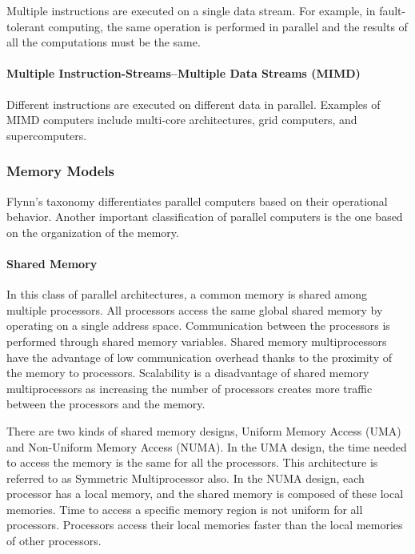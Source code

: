 Multiple instructions are executed on a single data stream. For example, in fault-tolerant computing, the same operation is performed in parallel and the results of all the computations must be the same.

\paragraph{Multiple Instruction-Streams--Multiple Data Streams (MIMD)}

Different instructions are executed on different data in parallel. Examples of MIMD computers include multi-core architectures, grid computers, and supercomputers.

\subsubsection{Memory Models}

Flynn's taxonomy differentiates parallel computers based on their operational behavior. Another important classification of parallel computers is the one based on the organization of the memory.

\paragraph{Shared Memory}

In this class of parallel architectures, a common memory is shared among multiple processors. All processors access the same global shared memory by operating on a single address space. Communication between the processors is performed through shared memory variables. Shared memory multiprocessors have the advantage of low communication overhead thanks to the proximity of the memory to processors. Scalability is a disadvantage of shared memory multiprocessors as increasing the number of processors creates more traffic between the processors and the memory.

There are two kinds of shared memory designs, Uniform Memory Access (UMA) and Non-Uniform Memory Access (NUMA). In the UMA design, the time needed to access the memory is the same for all the processors. This architecture is referred to as Symmetric Multiprocessor also. In the NUMA design, each processor has a local memory, and the shared memory is composed of these local memories. Time to access a specific memory region is not uniform for all processors. Processors access their local memories faster than the local memories of other processors.

